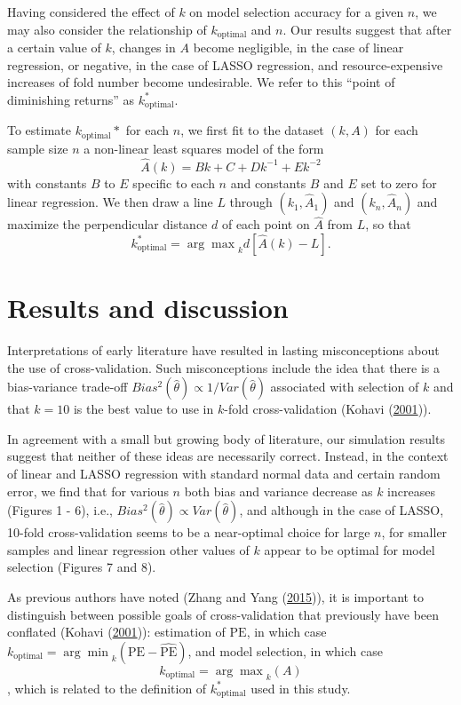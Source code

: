 \documentclass[
  12pt,
]{article}
\begin{document}
Having considered the effect of \(k\) on model selection accuracy for a
given \(n\), we may also consider the relationship of
\(k_\mathrm{optimal}\) and \(n\). Our results suggest that after a
certain value of \(k\), changes in \(A\) become negligible, in the case
of linear regression, or negative, in the case of LASSO regression, and
resource-expensive increases of fold number become undesirable. We refer
to this ``point of diminishing returns'' as \(k_\mathrm{optimal}^*\).

To estimate \(k_\mathrm{optimal}*\) for each \(n\), we first fit to the
dataset \((k,A)\) for each sample size \(n\) a non-linear least squares
model of the form \[\hat{A}(k) = Bk + C + Dk^{-1} + Ek^{-2}\] with
constants \(B\) to \(E\) specific to each \(n\) and constants \(B\) and
\(E\) set to zero for linear regression. We then draw a line \(L\)
through \((k_1, \hat{A}_1)\) and \((k_n, \hat{A}_n)\) and maximize the
perpendicular distance \(d\) of each point on \(\hat{A}\) from \(L\), so
that \[k_\mathrm{optimal}^* = {\arg\max}_k{d[\hat{A}(k)-L]}.\]

\hypertarget{results-and-discussion}{%
\section{Results and discussion}\label{results-and-discussion}}

Interpretations of early literature have resulted in lasting
misconceptions about the use of cross-validation. Such misconceptions
include the idea that there is a bias-variance trade-off
\(Bias^2(\hat{\theta}) \propto 1/Var(\hat{\theta})\) associated with
selection of \(k\) and that \(k = 10\) is the best value to use in
\(k\)-fold cross-validation (Kohavi
(\protect\hyperlink{ref-Kohavi2001}{2001})).

In agreement with a small but growing body of literature, our simulation
results suggest that neither of these ideas are necessarily correct.
Instead, in the context of linear and LASSO regression with standard
normal data and certain random error, we find that for various \(n\)
both bias and variance decrease as \(k\) increases (Figures 1 - 6),
i.e., \(Bias^2(\hat{\theta}) \propto Var(\hat{\theta})\), and although
in the case of LASSO, 10-fold cross-validation seems to be a
near-optimal choice for large \(n\), for smaller samples and linear
regression other values of \(k\) appear to be optimal for model
selection (Figures 7 and 8).

As previous authors have noted (Zhang and Yang
(\protect\hyperlink{ref-Zhang2015}{2015})), it is important to
distinguish between possible goals of cross-validation that previously
have been conflated (Kohavi (\protect\hyperlink{ref-Kohavi2001}{2001})):
estimation of \(\mathrm{PE}\), in which case
\(k_\mathrm{optimal} = {\arg\min}_{k}(\mathrm{PE} - \mathrm{\widehat{PE}})\),
and model selection, in which case
\[k_\mathrm{optimal} = {\arg\max}_k(A)\], which is related to the
definition of \(k_\mathrm{optimal}^*\) used in this study.
\end{document}
